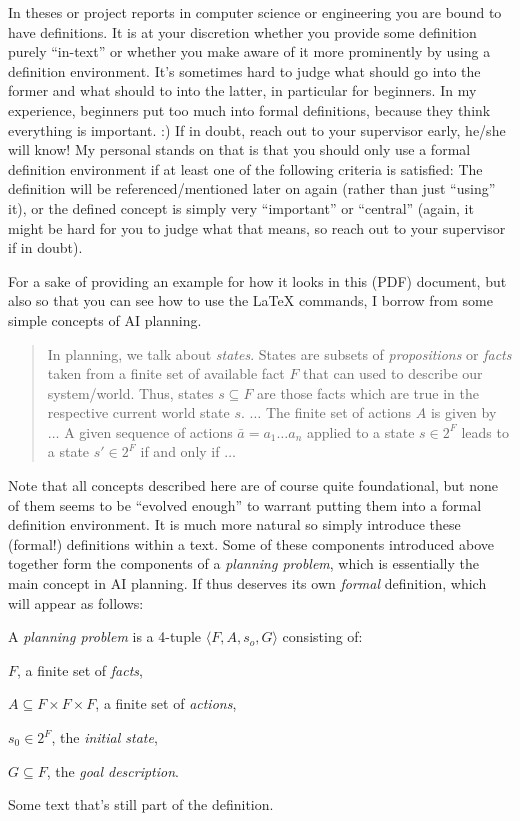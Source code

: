 In theses or project reports in computer science or engineering you are bound to have definitions. It is at your discretion whether you provide some definition purely ``in-text'' or whether you make aware of it more prominently by using a definition environment. It's sometimes hard to judge what should go into the former and what should to into the latter, in particular for beginners. In my experience, beginners put too much into formal definitions, because they think everything is important. :) If in doubt, reach out to your supervisor early, he/she will know! My personal stands on that is that you should only use a formal definition environment if at least one of the following criteria is satisfied: The definition will be referenced/mentioned later on again (rather than just ``using'' it), or the defined concept is simply very ``important'' or ``central'' (again, it might be hard for you to judge what that means, so reach out to your supervisor if in doubt).
  
    For a sake of providing an example for how it looks in this (PDF) document, but also so that you can see how to use the \LaTeX{} commands, I borrow from some simple concepts of AI planning.
  
    \begin{quote}In planning, we talk about \emph{states}. States are subsets of \emph{propositions} or \emph{facts} taken from a finite set of available fact $F$ that can used to describe our system/world. Thus, states $s\subseteq F$ are those facts which are true in the respective current world state $s$. $\dots$ The finite set of actions $A$ is given by $\dots$ A given sequence of actions $\bar{a}=a_1\dots a_n$ applied to a state $s\in 2^F$ leads to a state $s'\in 2^F$ if and only if $\dots$\end{quote}
  
    Note that all concepts described here are of course quite foundational, but none of them seems to be ``evolved enough'' to warrant putting them into a formal definition environment. It is much more natural so simply introduce these (formal!) definitions within a text. Some of these components introduced above together form the components of a \emph{planning problem}, which is essentially the main concept in AI planning. If thus deserves its own \emph{formal} definition, which will appear as follows:
  
    \begin{defn}\label{def:planningProblem}A \emph{planning problem} is a 4-tuple $\langle F, A, s_o, G\rangle$ consisting of:
    \begin{compactitem}
      \item $F$, a finite set of \emph{facts},
      \item $A\subseteq F\times F\times F$, a finite set of \emph{actions},
      \item $s_0\in 2^F$, the \emph{initial state},
      \item $G\subseteq F$, the \emph{goal description}.
    \end{compactitem}
    Some text that's still part of the definition.
    \end{defn}
  
